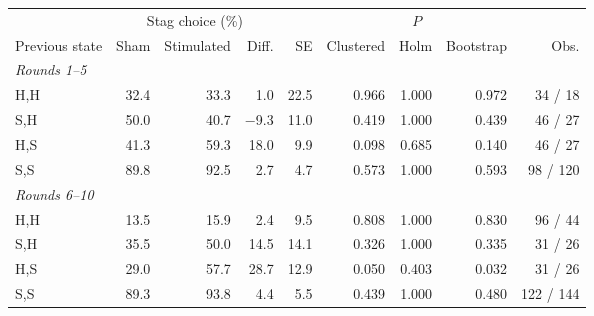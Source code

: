 \small
\begin{tabular}{lrrrrrrrr}
\toprule
& \multicolumn{3}{c}{Stag choice (\%)} & & \multicolumn{3}{c}{$P$} & \\
\cmidrule(lr){2-4} \cmidrule(lr){6-8}
Previous state & Sham & Stimulated & Diff. & SE & Clustered & Holm & Bootstrap & Obs. \\
\midrule
\textit{Rounds 1--5} &  &  &  &  &  &  &  &  \\
\quad H,H & 32.4 & 33.3 & 1.0 & 22.5 & 0.966 & 1.000 & 0.972 & 34 / 18 \\
\quad S,H & 50.0 & 40.7 & $-$9.3 & 11.0 & 0.419 & 1.000 & 0.439 & 46 / 27 \\
\quad H,S & 41.3 & 59.3 & 18.0 & 9.9 & 0.098 & 0.685 & 0.140 & 46 / 27 \\
\quad S,S & 89.8 & 92.5 & 2.7 & 4.7 & 0.573 & 1.000 & 0.593 & 98 / 120 \\
\textit{Rounds 6--10} &  &  &  &  &  &  &  &  \\
\quad H,H & 13.5 & 15.9 & 2.4 & 9.5 & 0.808 & 1.000 & 0.830 & 96 / 44 \\
\quad S,H & 35.5 & 50.0 & 14.5 & 14.1 & 0.326 & 1.000 & 0.335 & 31 / 26 \\
\quad H,S & 29.0 & 57.7 & 28.7 & 12.9 & 0.050 & 0.403 & 0.032 & 31 / 26 \\
\quad S,S & 89.3 & 93.8 & 4.4 & 5.5 & 0.439 & 1.000 & 0.480 & 122 / 144 \\
\bottomrule
\end{tabular}
